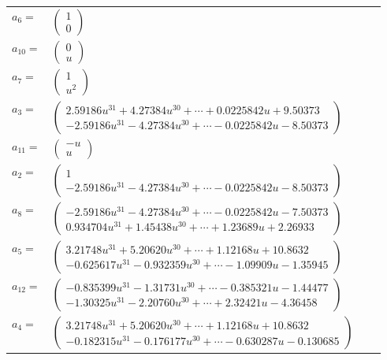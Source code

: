 \documentclass[1p]{elsarticle_modified}
\theoremstyle{definition}
\begin{document}
\begin{tabular}{m{7pt} m{180pt} m{7pt} m{180pt} }
\flushright $a_{6}=$&$\begin{pmatrix}1\\0\end{pmatrix}$ \\
\flushright $a_{10}=$&$\begin{pmatrix}0\\u\end{pmatrix}$ \\
\flushright $a_{7}=$&$\begin{pmatrix}1\\u^2\end{pmatrix}$ \\
\flushright $a_{3}=$&$\begin{pmatrix}2.59186 u^{31}+4.27384 u^{30}+\cdots+0.0225842 u+9.50373\\-2.59186 u^{31}-4.27384 u^{30}+\cdots-0.0225842 u-8.50373\end{pmatrix}$ \\
\flushright $a_{11}=$&$\begin{pmatrix}- u\\u\end{pmatrix}$ \\
\flushright $a_{2}=$&$\begin{pmatrix}1\\-2.59186 u^{31}-4.27384 u^{30}+\cdots-0.0225842 u-8.50373\end{pmatrix}$ \\
\flushright $a_{8}=$&$\begin{pmatrix}-2.59186 u^{31}-4.27384 u^{30}+\cdots-0.0225842 u-7.50373\\0.934704 u^{31}+1.45438 u^{30}+\cdots+1.23689 u+2.26933\end{pmatrix}$ \\
\flushright $a_{5}=$&$\begin{pmatrix}3.21748 u^{31}+5.20620 u^{30}+\cdots+1.12168 u+10.8632\\-0.625617 u^{31}-0.932359 u^{30}+\cdots-1.09909 u-1.35945\end{pmatrix}$ \\
\flushright $a_{12}=$&$\begin{pmatrix}-0.835399 u^{31}-1.31731 u^{30}+\cdots-0.385321 u-1.44477\\-1.30325 u^{31}-2.20760 u^{30}+\cdots+2.32421 u-4.36458\end{pmatrix}$ \\
\flushright $a_{4}=$&$\begin{pmatrix}3.21748 u^{31}+5.20620 u^{30}+\cdots+1.12168 u+10.8632\\-0.182315 u^{31}-0.176177 u^{30}+\cdots-0.630287 u-0.130685\end{pmatrix}$ \\

\end{tabular}
\end{document}
